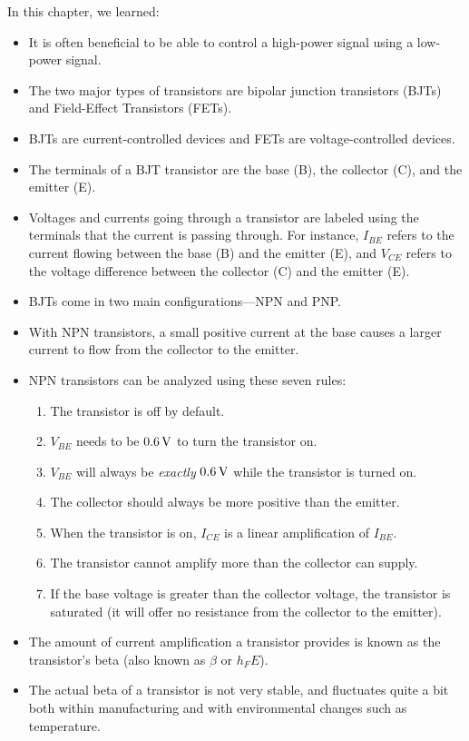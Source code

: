 \reviewsection

In this chapter, we learned:
\begin{itemize}
\item It is often beneficial to be able to control a high-power signal using a low-power signal.
\item The two major types of transistors are bipolar junction transistors (BJTs) and Field-Effect Transistors (FETs).
\item BJTs are current-controlled devices and FETs are voltage-controlled devices.
\item The terminals of a BJT transistor are the base (B), the collector (C), and the emitter (E).
\item Voltages and currents going through a transistor are labeled using the terminals that the current is passing through.  For instance, $I_{BE}$ refers to the current flowing between the base (B) and the emitter (E), and $V_{CE}$ refers to the voltage difference between the collector (C) and the emitter (E).
\item BJTs come in two main configurations---NPN and PNP.
\item With NPN transistors, a small positive current at the base causes a larger current to flow from the collector to the emitter.
\item NPN transistors can be analyzed using these seven rules:
\begin{enumerate}
\item The transistor is off by default.
\item $V_{BE}$ needs to be $0.6\,\si{\volt}$ to turn the transistor on.
\item $V_{BE}$ will always be \emph{exactly} $0.6\,\si{\volt}$ while the transistor is turned on.
\item The collector should always be more positive than the emitter.
\item When the transistor is on, $I_{CE}$ is a linear amplification of $I_{BE}$.
\item The transistor cannot amplify more than the collector can supply.
\item If the base voltage is greater than the collector voltage, the transistor is saturated (it will offer no resistance from the collector to the emitter).
\end{enumerate}
\item The amount of current amplification a transistor provides is known as the transistor's beta (also known as $\beta$ or $h_FE$).
\item The actual beta of a transistor is not very stable, and fluctuates quite a bit both within manufacturing and with environmental changes such as temperature.

\end{itemize}
